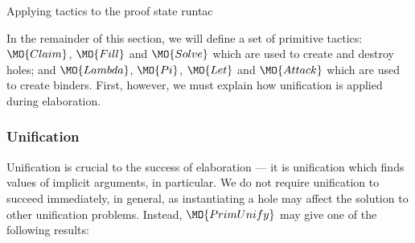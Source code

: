 {Applying tactics to the proof state}
{runtac}

In the remainder of this section, we will define a set of primitive tactics:
$\MO{Claim}$, $\MO{Fill}$ and $\MO{Solve}$ which are used to create and destroy
holes; and $\MO{Lambda}$, $\MO{Pi}$, $\MO{Let}$ and $\MO{Attack}$ which are
used to create binders. First, however, we must explain how unification is
applied during elaboration.

\subsubsection{Unification}

Unification is crucial to the success of elaboration --- it is unification
which finds values of implicit arguments, in particular. We do not require
unification to succeed immediately, in general, as instantiating a hole may 
affect the solution to other unification problems. Instead, 
$\MO{PrimUnify}$ may give one of the following results:

